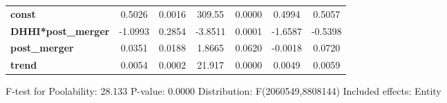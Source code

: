 \documentclass{report}
\begin{document}
\begin{center}
\begin{tabular}{lcccccc}
\midrule
\textbf{const}             &       0.5026       &       0.0016       &      309.55     &      0.0000      &       0.4994      &       0.5057       \\
\textbf{DHHI*post\_merger} &      -1.0993       &       0.2854       &     -3.8511     &      0.0001      &      -1.6587      &      -0.5398       \\
\textbf{post\_merger}      &       0.0351       &       0.0188       &      1.8665     &      0.0620      &      -0.0018      &       0.0720       \\
\textbf{trend}             &       0.0054       &       0.0002       &      21.917     &      0.0000      &       0.0049      &       0.0059       \\
\bottomrule
\end{tabular}
\end{center}

F-test for Poolability: 28.133 \newline
 P-value: 0.0000 \newline
 Distribution: F(2060549,8808144) \newline
  \newline
 Included effects: Entity
\end{document}
